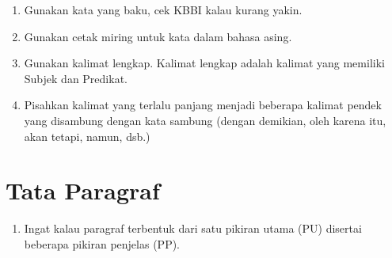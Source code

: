 \begin{enumerate}
    \item Gunakan kata yang baku, cek KBBI kalau kurang yakin.
    \item Gunakan cetak miring untuk kata dalam bahasa asing.
    \item Gunakan kalimat lengkap. Kalimat lengkap adalah kalimat yang memiliki Subjek dan Predikat.
    \item Pisahkan kalimat yang terlalu panjang menjadi beberapa kalimat pendek yang disambung dengan kata sambung (dengan demikian, oleh karena itu, akan tetapi, namun, dsb.)
\end{enumerate}

\section{Tata Paragraf}

\begin{enumerate}
    \item Ingat kalau paragraf terbentuk dari satu pikiran utama (PU) disertai beberapa pikiran penjelas (PP).
\end{enumerate}
